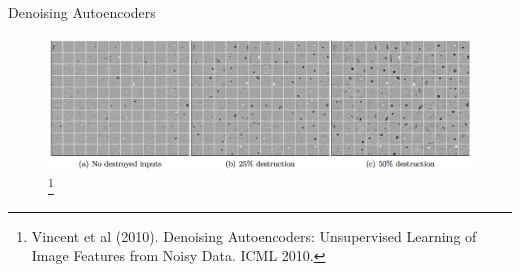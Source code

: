 \begin{frame}[allowframebreaks]{Denoising Autoencoders}
    \begin{figure}
        \flushleft
        \includegraphics[width=1\linewidth,height=\textheight,keepaspectratio]{images/ssl/slide_16_1_img.png}
        \footnote{Vincent et al (2010). Denoising Autoencoders: Unsupervised Learning of Image Features from Noisy Data. ICML 2010.}
    \end{figure}
\end{frame}